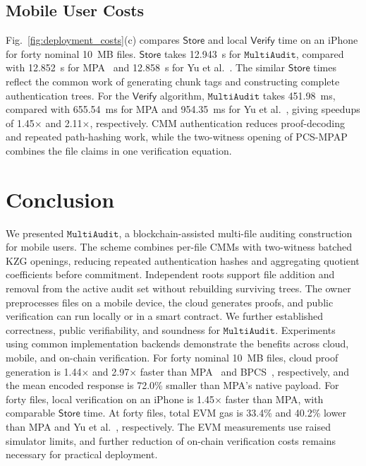 \documentclass[lettersize,journal]{IEEEtran}
\newcommand{\Store}{\ensuremath{\mathsf{Store}}}
\newcommand{\Verify}{\ensuremath{\mathsf{Verify}}}
\newcommand{\MultiAudit}{\ensuremath{\mathtt{MultiAudit}}}
\begin{document}
\subsection{Mobile User Costs}
\label{subsec:iphone_costs}
Fig.~\ref{fig:deployment_costs}(c) compares \Store{} and local \Verify{} time on an iPhone for forty nominal 10~MB files. \Store{} takes 12.943~s for \MultiAudit{}, compared with 12.852~s for MPA~\cite{XuTIFS26} and 12.858~s for Yu et al.~\cite{YuTC25}. The similar \Store{} times reflect the common work of generating chunk tags and constructing complete authentication trees.
For the \Verify{} algorithm, \MultiAudit{} takes 451.98~ms, compared with 655.54~ms for MPA and 954.35~ms for Yu et al.~\cite{YuTC25}, giving speedups of 1.45$\times$ and 2.11$\times$, respectively. CMM authentication reduces proof-decoding and repeated path-hashing work, while the two-witness opening of PCS-MPAP combines the file claims in one verification equation. 


\section{Conclusion}

We presented \MultiAudit{}, a blockchain-assisted multi-file auditing construction for mobile users. The scheme combines per-file CMMs with two-witness batched KZG openings, reducing repeated authentication hashes and aggregating quotient coefficients before commitment. Independent roots support file addition and removal from the active audit set without rebuilding surviving trees. The owner preprocesses files on a mobile device, the cloud generates proofs, and public verification can run locally or in a smart contract.
We further established correctness, public verifiability, and soundness for \MultiAudit{}. 
Experiments using common implementation backends demonstrate the benefits across cloud, mobile, and on-chain verification. For forty nominal 10~MB files, cloud proof generation is 1.44$\times$ and 2.97$\times$ faster than MPA~\cite{XuTIFS26} and BPCS~\cite{ZhangTPDS23}, respectively, and the mean encoded response is 72.0\% smaller than MPA's native payload. For forty files, local verification on an iPhone is 1.45$\times$ faster than MPA, with comparable \Store{} time. At forty files, total EVM gas is 33.4\% and 40.2\% lower than MPA and Yu et al.~\cite{YuTC25}, respectively. The EVM measurements use raised simulator limits, and further reduction of on-chain verification costs remains necessary for practical deployment.
\end{document}
